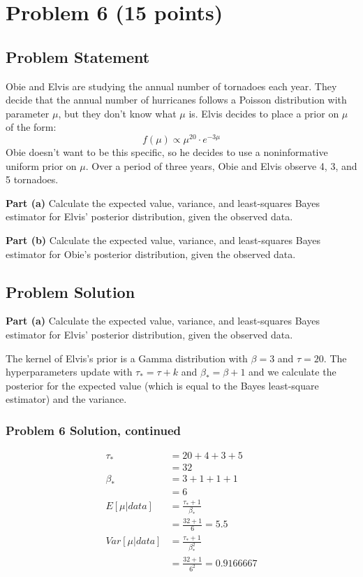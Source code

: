 \documentclass[12pt]{article}
\theoremstyle{definition}
\begin{document}
\section*{Problem 6 (15 points)}

\subsection*{Problem Statement}

Obie and Elvis are studying the annual number of tornadoes each year. They decide that the annual number of hurricanes follows a Poisson distribution with parameter $\mu$, but they don't know what $\mu$ is. Elvis decides to place a prior on $\mu$ of the form:
$$
f(\mu) \propto \mu^{20} \cdot e^{-3 \mu}
$$
Obie doesn't want to be this specific, so he decides to use a noninformative uniform prior on $\mu$. Over a period of three years, Obie and Elvis observe 4, 3, and 5 tornadoes.

\bigskip
\noindent
{\bf Part (a)} Calculate the expected value, variance, and least-squares Bayes estimator for Elvis' posterior distribution, given the observed data.

\bigskip
\noindent
{\bf Part (b)} Calculate the expected value, variance, and least-squares Bayes estimator for Obie's posterior distribution, given the observed data.


\subsection*{Problem Solution}
\bigskip
\noindent
{\bf Part (a)} Calculate the expected value, variance, and least-squares Bayes estimator for Elvis' posterior distribution, given the observed data.

The kernel of Elvis's prior is a Gamma distribution with $\beta = 3$ and $\tau = 20$.
The hyperparameters update with $\tau_* = \tau + k$ and $\beta_* = \beta + 1$ and we calculate the posterior for the expected value (which is equal to the Bayes least-square estimator) and the variance.



\newpage
\subsubsection*{Problem 6 Solution, continued}
\begin{align*}
\tau_* &= 20 + 4 + 3 + 5\\
&= 32\\
\beta_* &= 3 + 1 + 1 + 1\\
&= 6\\
E[\mu|data] &= \frac{\tau_* + 1}{\beta_*}\\
&= \frac{32 + 1}{6} = 5.5\\
Var[\mu|data] &= \frac{\tau_* + 1}{\beta_*^2}\\
&= \frac{32 + 1}{6^2} = 0.9166667
\end{align*}
\end{document}
